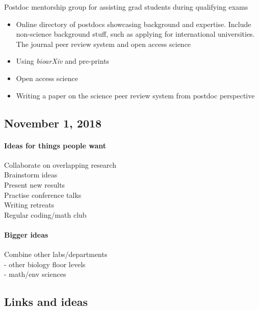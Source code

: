 \documentclass[10,portrait]{article}
\let\oldparagraph\paragraph
\renewcommand{\paragraph}[1]{\oldparagraph{#1}\mbox{}}
\begin{document}
Postdoc mentorship group for assisting grad students during qualifying
exams

\begin{itemize}
\item
  Online directory of postdocs showcasing background and expertise.
  Include non-science background stuff, such as applying for
  international universities.\\
  The journal peer review system and open access science
\item
  Using \emph{bioarXiv} and pre-prints\\
\item
  Open access science\\
\item
  Writing a paper on the science peer review system from postdoc
  perspective
\end{itemize}

\newpage  

\subsection{November 1, 2018}\label{november-1-2018}

\paragraph{Ideas for things people
want}\label{ideas-for-things-people-want}

Collaborate on overlapping research\\
Brainstorm ideas\\
Present new results\\
Practise conference talks\\
Writing retreats\\
Regular coding/math club

\paragraph{Bigger ideas}\label{bigger-ideas}

Combine other labs/departments\\
- other biology floor levels\\
- math/env sciences

\newpage  

\subsection{Links and ideas}\label{links-and-ideas}

\printbibliography
\end{document}
